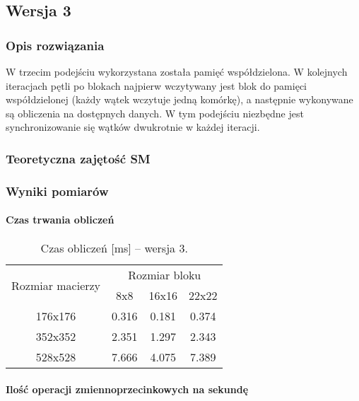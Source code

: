 
\subsection{Wersja 3}

\subsubsection{Opis rozwiązania}

W trzecim podejściu wykorzystana została pamięć współdzielona. W kolejnych iteracjach pętli po blokach najpierw wczytywany jest blok do pamięci współdzielonej (każdy wątek wczytuje jedną komórkę), a następnie wykonywane są obliczenia na dostępnych danych. W tym podejściu niezbędne jest synchronizowanie się wątków dwukrotnie w każdej iteracji.



\subsubsection{Teoretyczna zajętość SM}

\subsubsection{Wyniki pomiarów}

\paragraph{Czas trwania obliczeń}

\begin{table}[H]
\centering
\begin{tabular}{|c|c|c|c|}
\hline
\multirow{2}{*}{Rozmiar macierzy} & \multicolumn{3}{c|}{Rozmiar bloku} \\ \cline{2-4}
& 8x8 & 16x16 & 22x22 \\ \hline
176x176 & 0.316 & 0.181 & 0.374 \\ \hline
352x352 & 2.351 & 1.297 & 2.343 \\ \hline
528x528 & 7.666 & 4.075 & 7.389 \\ \hline
\end{tabular}
\caption{Czas obliczeń [ms] -- wersja 3.}
\end{table}

\paragraph{Ilość operacji zmiennoprzecinkowych na sekundę}

